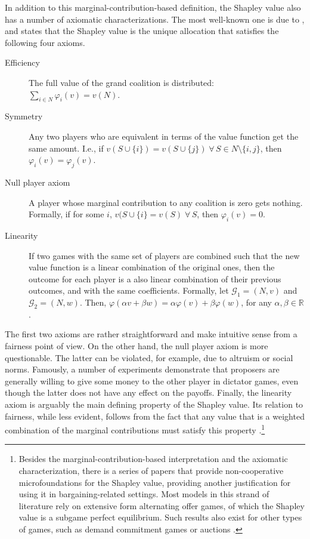 \documentclass[12pt]{article}
\begin{document}
In addition to this marginal-contribution-based definition, the Shapley value also has a number of axiomatic characterizations. The most well-known one is due to \textcite{shapley1953value}, and states that the Shapley value is the unique allocation that satisfies the following four axioms.
\begin{description}
    \item[Efficiency] The full value of the grand coalition is distributed: $\sum_{i \in N} \varphi_i(v) = v(N)$.
    \item[Symmetry] Any two players who are equivalent in terms of the value function get the same amount. I.e., if $v(S \cup \{i\}) = v(S \cup \{j\}) \;\forall\, S \in N \setminus \{i, j\}$, then $\varphi_i(v) = \varphi_j(v)$.
    \item[Null player axiom] A player whose marginal contribution to any coalition is zero gets nothing. Formally, if for some $i$, $v(S \cup \{i\} = v(S) \;\forall\, S$, then $\varphi_i(v) = 0$.
    \item[Linearity] If two games with the same set of players are combined such that the new value function is a linear combination of the original ones, then the outcome for each player is a also linear combination of their previous outcomes, and with the same coefficients. Formally, let $\mathcal{G}_1 = (N, v)$ and $\mathcal{G}_2 = (N, w)$. Then, $\varphi(\alpha v + \beta w) = \alpha \varphi(v) + \beta \varphi(w)$, for any $\alpha, \beta \in \mathbb{R}$.
\end{description} \label{axioms_statement}

The first two axioms are rather straightforward and make intuitive sense from a fairness point of view. On the other hand, the null player axiom is more questionable. The latter can be violated, for example, due to altruism or social norms. Famously, a number of experiments \parencite[for a meta-analysis, see][]{engel2011dictator} demonstrate that proposers are generally willing to give some money to the other player in dictator games, even though the latter does not have any effect on the payoffs. Finally, the linearity axiom is arguably the main defining property of the Shapley value. Its relation to fairness, while less evident, follows from the fact that any value that is a weighted combination of the marginal contributions must satisfy this property \parencite{weber1988probabilistic}.\footnote{Besides the marginal-contribution-based interpretation and the axiomatic characterization, there is a series of papers that provide non-cooperative microfoundations for the Shapley value, providing another justification for using it in bargaining-related settings. Most models in this strand of literature \parencite[e.g.][]{hart1996bargaining,gul1989bargaining,stole1996organizational} rely on extensive form alternating offer games, of which the Shapley value is a subgame perfect equilibrium. Such results also exist for other types of games, such as demand commitment games \parencite{winter1994demand} or auctions \parencite{van2021allocating}.}
\end{document}
